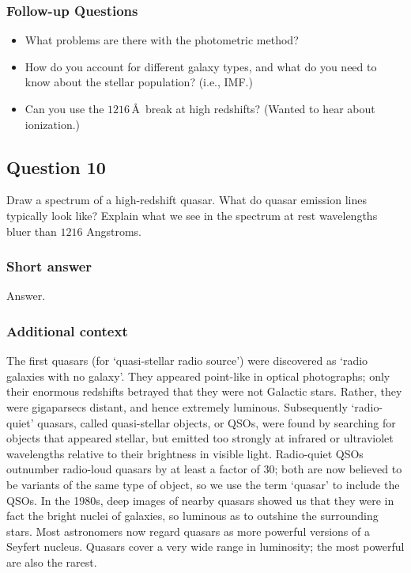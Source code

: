 \documentclass[a4paper,11pt]{article}
\begin{document}
\subsubsection{Follow-up Questions}

\begin{itemize}
    \item What problems are there with the photometric method?
    \item How do you account for different galaxy types, and what do you need to know about the stellar population? (i.e., IMF.)
    \item Can you use the $1216$\,\AA~break at high redshifts? (Wanted to hear about ionization.)
\end{itemize}



\newpage
\subsection{Question 10}

Draw a spectrum of a high-redshift quasar. What do quasar emission lines typically look like? Explain what we see in the spectrum at rest wavelengths bluer than $1216$ Angstroms.

\subsubsection{Short answer}

Answer.

\subsubsection{Additional context}

{\noindent}The first quasars (for `quasi-stellar radio source') were discovered  as `radio galaxies with no galaxy'. They appeared point-like in optical photographs; only their enormous redshifts betrayed that they were not Galactic stars. Rather, they were gigaparsecs distant, and hence extremely luminous. Subsequently `radio-quiet' quasars, called quasi-stellar objects, or QSOs, were found by searching for objects that appeared stellar, but emitted too strongly at infrared or ultraviolet wavelengths relative to their brightness in visible light. Radio-quiet QSOs outnumber radio-loud quasars by at least a factor of 30; both are now believed to be variants of the same type of object, so we use the term `quasar' to include the QSOs. In the 1980s, deep images of nearby quasars showed us that they were in fact the bright nuclei of galaxies, so luminous as to outshine the surrounding stars. Most astronomers now regard quasars as more powerful versions of a Seyfert nucleus. Quasars cover a very wide range in luminosity; the most powerful are also the rarest.
\end{document}

